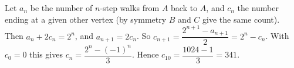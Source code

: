 Let $a_n$ be the number of $n$-step walks from $A$ back to $A$, and $c_n$ the number ending at a given other vertex (by symmetry $B$ and $C$ give the same count). Then $a_n+2c_n=2^n$, and $a_{n+1}=2c_n$. So $c_{n+1}=\dfrac{2^{n+1}-a_{n+1}}{2}=2^n-c_n$. With $c_0=0$ this gives $c_n=\dfrac{2^n-(-1)^n}3$. Hence $c_{10}=\dfrac{1024-1}3=\boxed{341}$.

